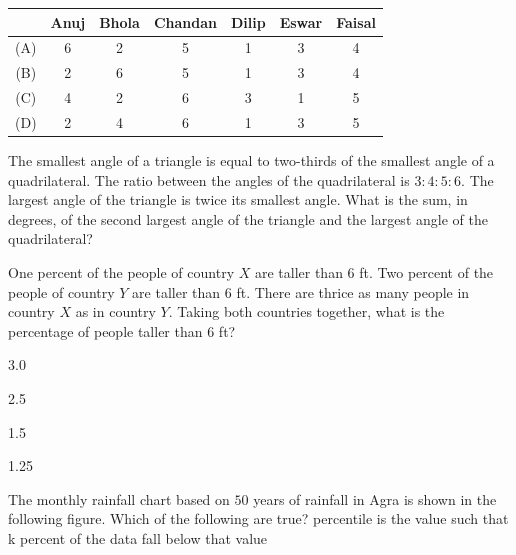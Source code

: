 \documentclass[journal,12pt,onecolumn]{IEEEtran}
\theoremstyle{remark}
\begin{document}
\begin{enumerate}
{{\hfill{}

\begin{center}
\renewcommand{\arraystretch}{1.2}
\begin{tabular}{|c|c|c|c|c|c|c|}
\hline
 & Anuj & Bhola & Chandan & Dilip & Eswar & Faisal\\
\hline
(A) & 6 & 2 & 5 & 1 & 3 & 4\\
\hline
(B) & 2 & 6 & 5 & 1 & 3 & 4\\
\hline
(C) & 4 & 2 & 6 & 3 & 1 & 5\\
\hline
(D) & 2 & 4 & 6 & 1 & 3 & 5\\
\hline
\end{tabular}
\end{center}

\item The smallest angle of a triangle is equal to two-thirds of the smallest angle of a quadrilateral. The ratio between the angles of the quadrilateral is $3:4:5:6$. The largest angle of the triangle is twice its smallest angle. What is the sum, in degrees, of the second largest angle of the triangle and the largest angle of the quadrilateral?

\hfill{}

\item One percent of the people of country $X$ are taller than $6$ ft. Two percent of the people of country $Y$ are taller than $6$ ft. There are thrice as many people in country $X$ as in country $Y$. Taking both countries together, what is the percentage of people taller than $6$ ft? 

\hfill{}

\begin{enumerate}
\begin{multicols}{4}
\item 3.0
\item 2.5
\item 1.5
\item 1.25
\end{multicols}
\end{enumerate}

\item The monthly rainfall chart based on $50$ years of rainfall in Agra is shown in the following figure. Which of the following are true?  percentile is the value such that k percent of the data fall below that value}

\hfill{}

}
\end{enumerate}
\end{document}

